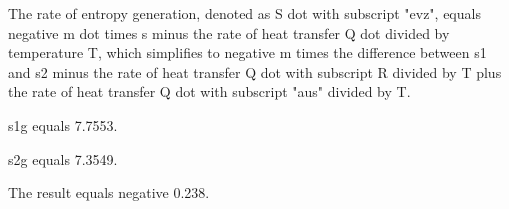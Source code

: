 The rate of entropy generation, denoted as S dot with subscript "evz", equals negative m dot times s minus the rate of heat transfer Q dot divided by temperature T, which simplifies to negative m times the difference between s1 and s2 minus the rate of heat transfer Q dot with subscript R divided by T plus the rate of heat transfer Q dot with subscript "aus" divided by T.

s1g equals 7.7553.

s2g equals 7.3549.

The result equals negative 0.238.